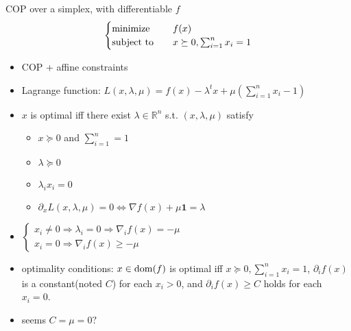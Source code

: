 \begin{remark}
    COP over a simplex, with differentiable $f$\[\begin{cases}
        \operatorname{minimize} \quad &f(x)\\
        \operatorname{subject\ to}\quad &x\succeq 0, \sum_{i = 1}^nx_i = 1
    \end{cases}\]
    \begin{itemize}
        \item COP + affine constraints
        \item Lagrange function: $L(x, \lambda, \mu) = f(x) - \lambda^tx + \mu(\sum_{i = 1}^nx_i - 1)$
        \item $x$ is optimal iff there exist $\lambda \in \mathbb{R}^n$ s.t. $(x, \lambda, \mu)$ satisfy\begin{itemize}
            \item $x \succeq 0$ and $\sum_{i = 1}^n = 1$
            \item $\lambda \succeq 0$
            \item $\lambda_ix_i = 0$
            \item $\partial_xL(x, \lambda, \mu) = 0 \Longleftrightarrow \nabla f(x) + \mu\mathbf{1} = \lambda$
        \end{itemize}
        \item $\begin{cases}
            x_i \neq 0 \Longrightarrow \lambda_i = 0\Longrightarrow \nabla_if(x) = -\mu\\
            x_i = 0 \Longrightarrow \nabla_if(x) \ge -\mu
        \end{cases}$
        \item optimality conditions: $x \in \operatorname{dom}(f)$ is optimal iff $x \succeq 0, \sum_{i = 1}^nx_i = 1$, $\partial_if(x)$ is a constant(noted $C$) for each $x_i > 0$, and $\partial_i f(x) \ge C$ holds for each $x_i = 0$.
        \item seems $C = \mu = 0?$
    \end{itemize}
\end{remark}

